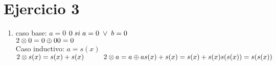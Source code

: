 \documentclass{article}
\begin{document}
    \section{Ejercicio 3}
    \begin{enumerate}
   \item 
   caso base: $a=0$ \hspace{2cm} $0 \hspace{0.1cm}si\hspace{0.1cm} a=0 \hspace{0.1cm}\vee \hspace{0.1cm} b=0$\\
   $2\otimes0 = 0 \oplus0 \\ 
   0=0$\\
    Caso inductivo: $a=s(x)$\\
    $2\otimes s(x)=s(x)+s(x) \hspace{1cm}2\otimes a = a\oplus a\\
    s(x)+s(x)=s(x)+s(x)\\
    s(s(x))=s(s(x))$

\end{enumerate}
\end{document}
